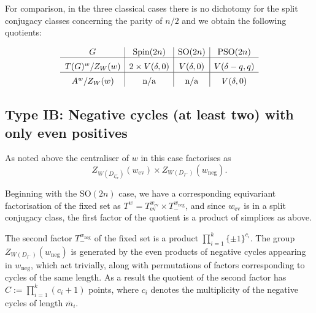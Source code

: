 \documentclass[11pt,a4paper]{article}
\def\Spin{\mathrm{Spin}}
\def\SO{\mathrm{SO}}
\def\PSO{\mathrm{PSO}}
\def\mbar{\overline{m}}
\def\mbar{\overline{m}}
\def\ev{\mathrm{ev}}
\def\neg{\mathrm{neg}}
\begin{document}
\medskip

For comparison, in the three classical cases there is no dichotomy for the split conjugacy classes concerning the parity of $n/2$ and we obtain the following quotients:

\bigskip

\begin{table}[h]
\[
\begin{array}{c|c|c|c}
G & \Spin(2n)   &
 \SO(2n)   & 
\PSO(2n)    \\
 \hline
{}^{\strut} T(G)^w/Z_W(w)& 2 \times V(\delta,0) &  V(\delta,0)  &V(\delta-q,q)\\
\hline
{}^{\strut} A^w/Z_W(w) &\text{n/a} &\text{n/a}
& V(\delta,0)
\end{array}
\]

\bigskip

   \caption{The structure of the $D_n$ sectors for split cycle types in the classical cases}
   
\end{table}








\bigskip
\bigskip




\subsection{Type IB: Negative cycles (at least two) with only even positives}\label{D_n case 2}

As noted above the centraliser of $w$ in this case factorises as
    \[
    Z_{W(D_{I^+_{\ev}})}(w_{\ev})\times Z_{W(D_{I^-})}(w_\neg).
    \]
    
Beginning with the $\SO(2n)$ case, we have a corresponding equivariant factorisation of the fixed set as $T^w=T^{w_\ev}_{\ev}\times T^{w_\neg}_-$, and since $w_{\ev}$ is in a split conjugacy class, the first factor of the quotient is a product of simplices as above.

The second factor $T^{w_\neg}_-$ of the fixed set is a product $\prod_{i=1}^k\{\pm 1\}^{c_i}$. The group $Z_{W(D_{I^-})}(w_\neg)$ is generated by the even products of negative cycles appearing in $w_\neg$, which act trivially, along with permutations of factors corresponding to cycles of the same length. As a result the quotient of the second factor has $C:=\prod_{i=1}^k (c_i+1)$ points, where $c_i$ denotes the multiplicity of the negative cycles of length $\mbar_i$.
\end{document}
